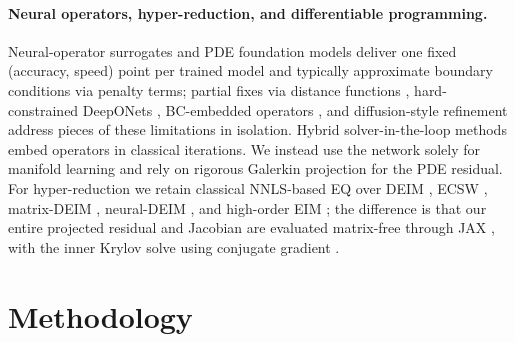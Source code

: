 \documentclass{article}
\begin{document}
\paragraph{Neural operators, hyper-reduction, and differentiable programming.}
Neural-operator surrogates
\citep{Li2020FNO,Lu2021DeepONet,Kovachki2023NeuralOperator,LiGeoFNO2023,TranFFNO2023,Cao2021GalerkinTransformer,LiOFormer2023,HaoGNOT2023,WuTransolver2024,WangLNO2024,WenGAOT2025,HuLinearNO2025,Shikhman2026BoundaryIndexed}
and PDE foundation models
\citep{HerdePoseidon2024,McCabeMPP2024,HaoDPOT2024,HolzschuhPDETransformer2025}
deliver one fixed (accuracy, speed) point per trained model and
typically approximate boundary conditions via penalty terms; partial
fixes via distance functions
\citep{SukumarSrivastava2022,BerroneBC2022}, hard-constrained
DeepONets \citep{BrechtHardConstraints2023}, BC-embedded operators
\citep{WangBENO2024}, and diffusion-style refinement
\citep{LippePDERefiner2023} address pieces of these limitations in
isolation. Hybrid solver-in-the-loop methods
\citep{UmSolverInTheLoop2020,Kochkov2021PNAS,KopanicakovaKarniadakis2024,EshaghiNOWS2025,Raissi2019,Karniadakis2021PIML}
embed operators in classical iterations. We instead use the network
solely for manifold learning and rely on rigorous Galerkin projection
\citep{Carlberg2011LSPG} for the PDE residual. For hyper-reduction we
retain classical NNLS-based EQ
\citep{Hernandez2017EQ,YanoPatera2019LPEQ,LawsonHanson1974NNLS} over
DEIM \citep{ChaturantabutSorensen2010}, ECSW \citep{FarhatECSW2014},
matrix-DEIM \citep{NegriManzoniAmsallem2015}, neural-DEIM
\citep{HirschPichiHesthavenNEIM2024}, and high-order EIM
\citep{Nguyen2024HighOrderEIM}; the difference is that our entire
projected residual and Jacobian are evaluated matrix-free through JAX
\citep{Bradbury2018JAX,GriewankWalther2008}, with the inner Krylov
solve using conjugate gradient
\citep{HestenesStiefel1952CG,Saad2003}.

\section{Methodology}\label{sec:method}
\end{document}
